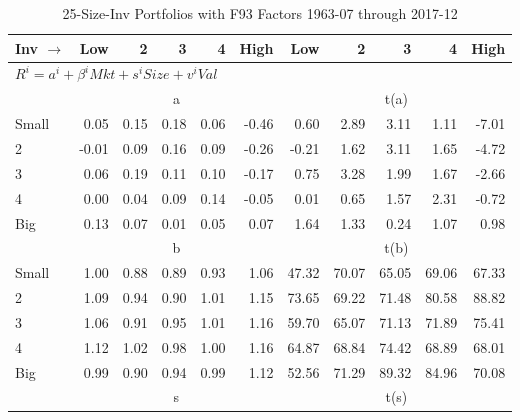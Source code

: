
\begin{table}[!ht]
\footnotesize
\centering
\caption{25-Size-Inv Portfolios with F93 Factors 1963-07 through 2017-12}
\begin{tabular}{lrrrrrrrrrr}
  \toprule
    Inv $\rightarrow$ & Low & 2 & 3 & 4 & High & Low & 2 & 3 & 4 & High \\ 
  \midrule
  \multicolumn{11}{l}{$R^i=a^i+\beta^iMkt+s^iSize+v^iVal$} \\

  
    
      & \multicolumn{5}{c}{a} & \multicolumn{5}{c}{t(a)}
    
    \\
      \cmidrule(r){2-6} \cmidrule(r){7-11}

    Small   & 0.05  & 0.15  & 0.18  & 0.06  & -0.46  & 0.60  & 2.89  & 3.11  & 1.11  & -7.01  \\
         2  & -0.01  & 0.09  & 0.16  & 0.09  & -0.26  & -0.21  & 1.62  & 3.11  & 1.65  & -4.72  \\
         3  & 0.06  & 0.19  & 0.11  & 0.10  & -0.17  & 0.75  & 3.28  & 1.99  & 1.67  & -2.66  \\
         4  & 0.00  & 0.04  & 0.09  & 0.14  & -0.05  & 0.01  & 0.65  & 1.57  & 2.31  & -0.72  \\
    Big     & 0.13  & 0.07  & 0.01  & 0.05  & 0.07  & 1.64  & 1.33  & 0.24  & 1.07  & 0.98  \\

  
    
      & \multicolumn{5}{c}{b} & \multicolumn{5}{c}{t(b)}
    
    \\
      \cmidrule(r){2-6} \cmidrule(r){7-11}

    Small   & 1.00  & 0.88  & 0.89  & 0.93  & 1.06  & 47.32  & 70.07  & 65.05  & 69.06  & 67.33  \\
         2  & 1.09  & 0.94  & 0.90  & 1.01  & 1.15  & 73.65  & 69.22  & 71.48  & 80.58  & 88.82  \\
         3  & 1.06  & 0.91  & 0.95  & 1.01  & 1.16  & 59.70  & 65.07  & 71.13  & 71.89  & 75.41  \\
         4  & 1.12  & 1.02  & 0.98  & 1.00  & 1.16  & 64.87  & 68.84  & 74.42  & 68.89  & 68.01  \\
    Big     & 0.99  & 0.90  & 0.94  & 0.99  & 1.12  & 52.56  & 71.29  & 89.32  & 84.96  & 70.08  \\

  
    
      & \multicolumn{5}{c}{s} & \multicolumn{5}{c}{t(s)}
    

\end{tabular}
\end{table}
